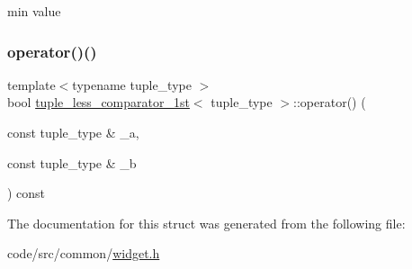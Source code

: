 min value 

\mbox{\label{structtuple__less__comparator__1st_ad97f49eea57d8fec456d9d00a5126deb}} 
\subsubsection{\texorpdfstring{operator()()}{operator()()}}
{\footnotesize\ttfamily template$<$typename tuple\+\_\+type $>$ \\
bool \hyperlink{structtuple__less__comparator__1st}{tuple\+\_\+less\+\_\+comparator\+\_\+1st}$<$ tuple\+\_\+type $>$\+::operator() (\begin{DoxyParamCaption}\item[{const tuple\+\_\+type \&}]{\+\_\+a,  }\item[{const tuple\+\_\+type \&}]{\+\_\+b }\end{DoxyParamCaption}) const\hspace{0.3cm}{\ttfamily [inline]}}



The documentation for this struct was generated from the following file\+:\begin{DoxyCompactItemize}
\item 
code/src/common/\hyperlink{widget_8h}{widget.\+h}\end{DoxyCompactItemize}
